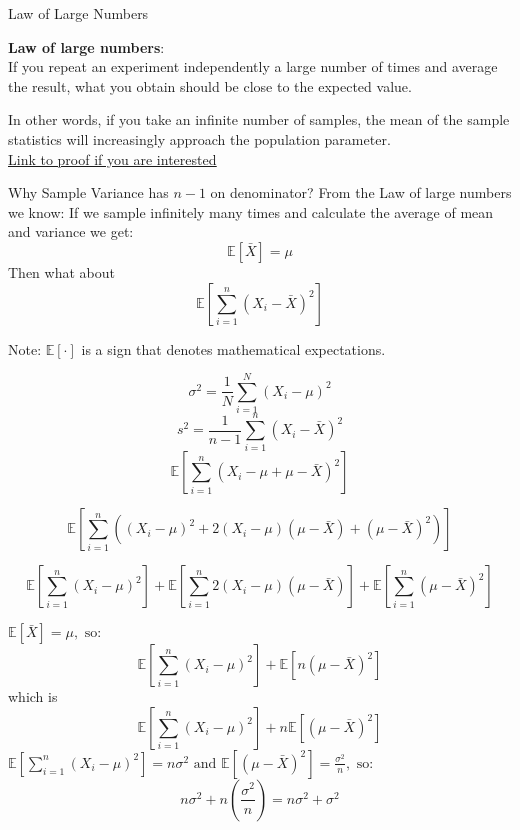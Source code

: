 \documentclass[12pt]{beamer}
\begin{document}
\begin{frame}{Law of Large Numbers}

{\bf Law of large numbers}:\medskip\\
If you repeat an experiment independently a large number of times and average the result, what you obtain should be close to the expected value.

In other words, if you take an infinite number of samples, the mean of the sample statistics will increasingly approach the population parameter.\medskip\\
\href{https://www.math.ucdavis.edu/~tracy/courses/math135A/UsefullCourseMaterial/lawLargeNo.pdf}{\color{blue}\underline{Link to proof if you are interested}}
\end{frame}
\begin{frame}{Why Sample Variance has $n-1$ on denominator?}
From the Law of large numbers we know: If we sample infinitely many times and calculate the {\color{red}average} of {\color{blue}mean} and {\color{blue}variance} we get:
	\[\mathbb E[\bar{X}]=\mu\]
	Then what about
	$$\mathbb E[\sum_{i=1}^n (X_i - \bar{X})^2]$$
	
	Note: $\mathbb E[\cdot]$ is a sign that denotes mathematical expectations.
\end{frame}
\begin{frame}
	$$\sigma^2=\frac{1}{N}\sum_{i=1}^N(X_i-\mu)^2$$
	\[s^2 = \frac{1}{n-1} \sum_{i=1}^n (X_i - \bar{X})^2\]
	\[\mathbb E[\sum_{i=1}^n (X_i - \mu + \mu - \bar{X})^2]\]
\end{frame}
\begin{frame}
	\[\mathbb E[\sum_{i=1}^n ((X_i - \mu)^2 + 2(X_i - \mu)(\mu - \bar{X}) + (\mu - \bar{X})^2)]\]
	
	\[\mathbb E[\sum_{i=1}^n (X_i - \mu)^2] + \mathbb E[\sum_{i=1}^n 2(X_i - \mu)(\mu - \bar{X})] + \mathbb E[\sum_{i=1}^n (\mu - \bar{X})^2]\]
\end{frame}
\begin{frame}
	 $\mathbb E[\bar{X}] = \mu, \text{ so:}$
	\[\mathbb E[\sum_{i=1}^n (X_i - \mu)^2] + \mathbb E[n(\mu - \bar{X})^2]\]
	which is
		\[\mathbb E[\sum_{i=1}^n (X_i - \mu)^2] + n\mathbb E[(\mu - \bar{X})^2]\]
 $\mathbb E[\sum_{i=1}^n (X_i - \mu)^2] = n\sigma^2 \text{ and } \mathbb E[(\mu - \bar{X})^2] = \frac{\sigma^2}{n}, \text{ so:}$
	\[n\sigma^2 + n(\frac{\sigma^2}{n}) = n\sigma^2 + \sigma^2\]
\end{frame}
\end{document}
